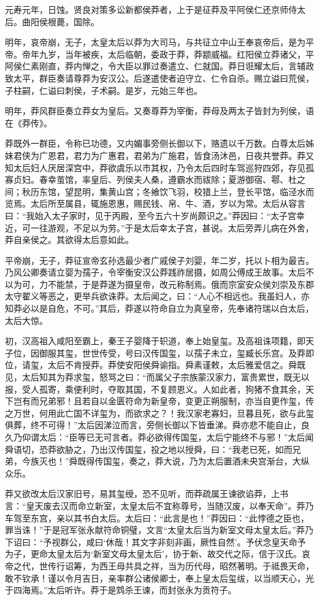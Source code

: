 \documentclass[]{article}
\begin{document}
元寿元年，日蚀。贤良对策多讼新都侯莽者，上于是征莽及平阿侯仁还京师侍太后。曲阳侯根薨，国除。

明年，哀帝崩，无子，太皇太后以莽为大司马，与共征立中山王奉哀帝后，是为平帝。帝年九岁，当年被疾，太后临朝，委政于莽，莽颛威福。红阳侯立莽诸父，平阿侯仁素刚直，莽内惮之，令大臣以罪过奏遣立、仁就国。莽日诳耀太后，言辅政致太平，群臣奏请尊莽为安汉公。后遂遣使者迫守立、仁令自杀。赐立谥曰荒侯，子柱嗣，仁谥曰刺侯，子术嗣。是岁，元始三年也。

明年，莽风群臣奏立莽女为皇后。又奏尊莽为宰衡，莽母及两太子皆封为列侯，语在《莽传》。

莽既外一群臣，令称已功德，又内媚事旁侧长御以下，赂遗以千万数。白尊太后姊妹君侠为广恩君，君力为广惠君，君弟为广施君，皆食汤沐邑，日夜共誉莽。莽又知太后妇人厌居深宫中，莽欲虞乐以市其权，乃令太后四时车驾巡狩四郊，存见孤寡贞妇。春幸茧馆，率皇后、列侯夫人桑，遵霸水而祓除；夏游御宿、鄠、杜之间；秋历东馆，望昆明，集黄山宫；冬飨饮飞羽，校猎上兰，登长平馆，临泾水而览焉。太后所至属县，辄施恩惠，赐民钱、帛、牛、酒，岁以为常。太后从容言曰：``我始入太子家时，见于丙殿，至今五六十岁尚颇识之。''莽因曰：``太子宫幸近，可一往游观，不足以为劳。''于是太后幸太子宫，甚说。太后旁弄儿病在外舍，莽自亲侯之。其欲得太后意如此。

平帝崩，无子，莽征宣帝玄孙选最少者广戚侯子刘婴，年二岁，托以卜相为最吉。乃风公卿奏请立婴为孺子，令宰衡安汉公莽践祚居摄，如周公傅成王故事。太后不以为可，力不能禁，于是莽遂为摄皇帝，改元称制焉。俄而宗室安众侯刘崇及东郡太守翟义等恶之，更举兵欲诛莽。太后闻之，曰：``人心不相远也。我虽妇人，亦知莽必以是自危，不可。''其后，莽遂以符命自立为真皇帝，先奉诸符瑞以白太后，太后大惊。

初，汉高祖入咸阳至霸上，秦王子婴降于轵道，奉上始皇玺。及高祖诛项籍，即天子位，因御服其玺，世世传受，号曰汉传国玺，以孺子未立，玺臧长乐宫。及莽即位，请玺，太后不肯授莽。莽使安阳侯舜谕指。舜素谨敕，太后雅爱信之。舜既见，太后知其为莽求玺，怒骂之曰：``而属父子宗族蒙汉家力，富贵累世，既无以报，受人孤寄，乘便利时，夺取其国，不复顾恩义。人如此者，狗猪不食其余，天下岂有而兄弟邪！且若自以金匮符命为新皇帝，变更正朔服制，亦当自更作玺，传之万世，何用此亡国不详玺为，而欲求之？！我汉家老寡妇，旦暮且死，欲与此玺俱葬，终不可得！''太后因涕泣而言，旁侧长御以下皆垂涕。舜亦悲不能自止，良久乃仰谓太后：``臣等已无可言者。莽必欲得传国玺，太后宁能终不与邪！''太后闻舜语切，恐莽欲胁之，乃出汉传国玺，投之地以授舜，曰：``我老已死，如而兄弟，今族灭也！''舜既得传国玺，奏之，莽大说，乃为太后置酒未央宫渐台，大纵众乐。

莽又欲改太后汉家旧号，易其玺绶，恐不见听，而莽疏属王谏欲谄莽，上书言：``皇天废去汉而命立新室，太皇太后不宜称尊号，当随汉废，以奉天命''。莽乃车驾至东宫，亲以其书白太后。太后曰：``此言是也！''莽因曰：``此悖德之臣也，罪当诛！''于是冠军张永献符命铜璧，文言``太皇太后当为新室文母太皇太后。''莽乃下诏曰：``予视群公，咸曰`休哉！其文字非刻非画，厥性自然'。予伏念皇天命予为子，更命太皇太后为`新室文母太皇太后'，协于新、故交代之际，信于汉氏。哀帝之代，世传行诏筹，为西王母共具之祥，当为历代母，昭然著明。于祗畏天命，敢不钦承！谨以令月吉日，亲率群公诸侯卿士，奉上皇太后玺绂，以当顺天心，光于四海焉。''太后听许。莽于是鸩杀王谏，而封张永为贡符子。
\end{document}
